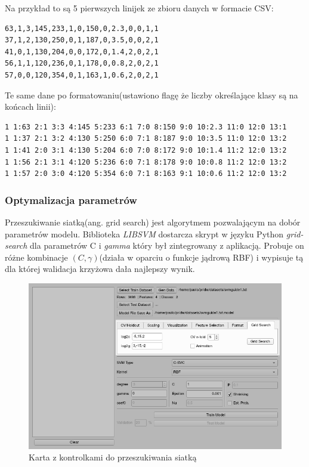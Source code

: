 \documentclass[paper=a4, fontsize=11pt]{scrartcl} %
\numberwithin{equation}{section} %
\numberwithin{figure}{section} %
\begin{document}
    \par Na przykład to są 5 pierwszych linijek ze zbioru danych w formacie CSV:

    \begin{verbatim}
63,1,3,145,233,1,0,150,0,2.3,0,0,1,1
37,1,2,130,250,0,1,187,0,3.5,0,0,2,1
41,0,1,130,204,0,0,172,0,1.4,2,0,2,1
56,1,1,120,236,0,1,178,0,0.8,2,0,2,1
57,0,0,120,354,0,1,163,1,0.6,2,0,2,1
    \end{verbatim}

    \par Te same dane po formatowaniu(ustawiono flagę że liczby określające klasy są na końcach
    linii):

    \begin{verbatim}
1 1:63 2:1 3:3 4:145 5:233 6:1 7:0 8:150 9:0 10:2.3 11:0 12:0 13:1
1 1:37 2:1 3:2 4:130 5:250 6:0 7:1 8:187 9:0 10:3.5 11:0 12:0 13:2
1 1:41 2:0 3:1 4:130 5:204 6:0 7:0 8:172 9:0 10:1.4 11:2 12:0 13:2
1 1:56 2:1 3:1 4:120 5:236 6:0 7:1 8:178 9:0 10:0.8 11:2 12:0 13:2
1 1:57 2:0 3:0 4:120 5:354 6:0 7:1 8:163 9:1 10:0.6 11:2 12:0 13:2
    \end{verbatim}

\subsubsection{Optymalizacja parametrów}
    \par Przeszukiwanie siatką(ang. grid search) jest algorytmem pozwalającym na dobór
    parametrów modelu. Biblioteka \textit{LIBSVM} dostarcza skrypt w języku Python
    \textit{grid-search} dla parametrów C i \textit{gamma} który był zintegrowany z aplikacją.
    Probuje on różne kombinacje $(C, \gamma)$(działa w oparciu o funkcje jądrową RBF) i
    wypisuje tą dla której walidacja krzyżowa dała najlepszy wynik. 

    \begin{figure}[H]
        \begin{center}
            \includegraphics[scale=0.7]{./img/svm_app_grid_search.png}
            \caption{Karta z kontrolkami do przeszukiwania siatką}
            \label{fig:grid_search}
        \end{center}
    \end{figure}
\end{document}
